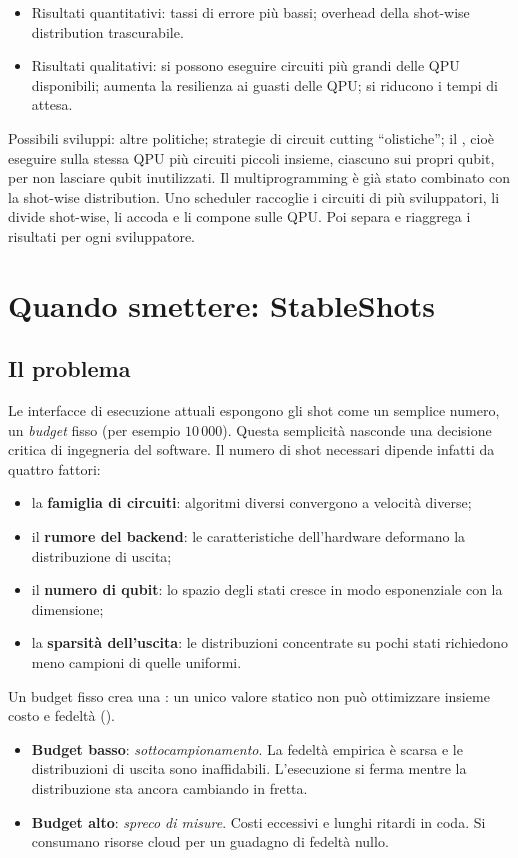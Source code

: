 \begin{itemize}
  \item Risultati quantitativi: tassi di errore più bassi; overhead della shot-wise distribution trascurabile.
  \item Risultati qualitativi: si possono eseguire circuiti più grandi delle QPU disponibili; aumenta la resilienza ai
    guasti delle QPU; si riducono i tempi di attesa.
\end{itemize}

Possibili sviluppi: altre politiche; strategie di circuit cutting ``olistiche''; il , cioè
eseguire sulla stessa QPU più circuiti piccoli insieme, ciascuno sui propri qubit, per non lasciare qubit inutilizzati.
Il multiprogramming è già stato combinato con la shot-wise distribution. Uno scheduler raccoglie i circuiti di più
sviluppatori, li divide shot-wise, li accoda e li compone sulle QPU. Poi separa e riaggrega i risultati per ogni
sviluppatore.

\section{Quando smettere: StableShots}
\label{sec:qse-stop}

\subsection{Il problema}

Le interfacce di esecuzione attuali espongono gli shot come un semplice numero, un \emph{budget} fisso (per esempio
$10\,000$). Questa semplicità nasconde una decisione critica di ingegneria del software. Il numero di shot necessari
dipende infatti da quattro fattori:
\begin{itemize}
  \item la \textbf{famiglia di circuiti}: algoritmi diversi convergono a velocità diverse;
  \item il \textbf{rumore del backend}: le caratteristiche dell'hardware deformano la distribuzione di uscita;
  \item il \textbf{numero di qubit}: lo spazio degli stati cresce in modo esponenziale con la dimensione;
  \item la \textbf{sparsità dell'uscita}: le distribuzioni concentrate su pochi stati richiedono meno campioni di quelle
    uniformi.
\end{itemize}

Un budget fisso crea una : un unico valore statico non può ottimizzare insieme costo e
fedeltà ().
\begin{itemize}
  \item \textbf{Budget basso}: \emph{sottocampionamento}. La fedeltà empirica è scarsa e le distribuzioni di uscita sono
    inaffidabili. L'esecuzione si ferma mentre la distribuzione sta ancora cambiando in fretta.
  \item \textbf{Budget alto}: \emph{spreco di misure}. Costi eccessivi e lunghi ritardi in coda. Si consumano risorse
    cloud per un guadagno di fedeltà nullo.
\end{itemize}

